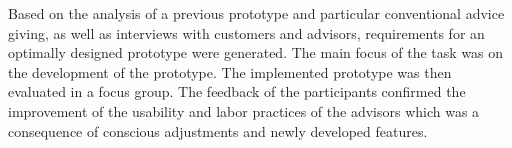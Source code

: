 \documentclass[a4paper,twoside, openright]{report}
\begin{document}
Based on the analysis of a previous prototype and particular conventional advice giving, as well as interviews with customers and advisors, requirements for an optimally designed prototype were generated. The main focus of the task was on the development of the prototype. The implemented prototype was then evaluated in a focus group. The feedback of the participants confirmed the improvement of the usability and labor practices of the advisors which was a consequence of conscious adjustments and newly developed features.

\tableofcontents

\newpage

\pagestyle{headings}

\newpage


\end{document}
